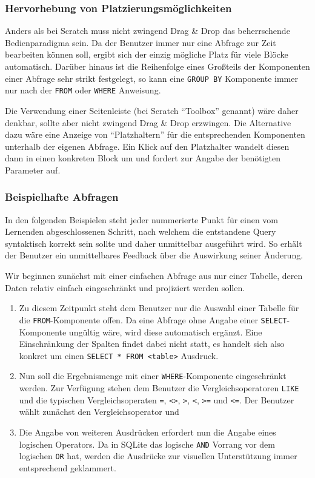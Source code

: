 \documentclass[paper=a4,fontsize=11pt,parskip=half]{scrartcl}
\begin{document}
\subsubsection{Hervorhebung von Platzierungsmöglichkeiten}

Anders als bei Scratch muss nicht zwingend Drag \& Drop das beherrschende Bedienparadigma sein. Da der Benutzer immer nur eine Abfrage zur Zeit bearbeiten können soll, ergibt sich der einzig mögliche Platz für viele Blöcke automatisch. Darüber hinaus ist die Reihenfolge eines Großteils der Komponenten einer Abfrage sehr strikt festgelegt, so kann eine \texttt{GROUP BY} Komponente immer nur nach der \texttt{FROM} oder \texttt{WHERE} Anweisung.

Die Verwendung einer Seitenleiste (bei Scratch ``Toolbox'' genannt) wäre daher denkbar, sollte aber nicht zwingend Drag \& Drop erzwingen. Die Alternative dazu wäre eine Anzeige von ``Platzhaltern'' für die entsprechenden Komponenten unterhalb der eigenen Abfrage. Ein Klick auf den Platzhalter wandelt diesen dann in einen konkreten Block um und fordert zur Angabe der benötigten Parameter auf.


\subsubsection{Beispielhafte Abfragen}

In den folgenden Beispielen steht jeder nummerierte Punkt für einen vom Lernenden abgeschlossenen Schritt, nach welchem die entstandene Query syntaktisch korrekt sein sollte und daher unmittelbar ausgeführt wird. So erhält der Benutzer ein unmittelbares Feedback über die Auswirkung seiner Änderung.

Wir beginnen zunächst mit einer einfachen Abfrage aus nur einer Tabelle, deren Daten relativ einfach eingeschränkt und projiziert werden sollen.

\begin{enumerate}
  \item Zu diesem Zeitpunkt steht dem Benutzer nur die Auswahl einer Tabelle für die \texttt{FROM}-Komponente offen. Da eine Abfrage ohne Angabe einer \texttt{SELECT}-Komponente ungültig wäre, wird diese automatisch ergänzt. Eine Einschränkung der Spalten findet dabei nicht statt, es handelt sich also konkret um einen \texttt{SELECT * FROM <table>} Ausdruck.
  \item Nun soll die Ergebnismenge mit einer \texttt{WHERE}-Komponente eingeschränkt werden. Zur Verfügung stehen dem Benutzer die Vergleichsoperatoren \texttt{LIKE} und die typischen Vergleichsoperaten \texttt{=}, \texttt{<>}, \texttt{>}, \texttt{<}, \texttt{>=} und \texttt{<=}. Der Benutzer wählt zunächst den Vergleichsoperator und
  \item Die Angabe von weiteren Ausdrücken erfordert nun die Angabe eines logischen Operators. Da in SQLite das logische \texttt{AND} Vorrang vor dem logischen \texttt{OR} hat, werden die Ausdrücke zur visuellen Unterstützung immer entsprechend geklammert.
\end{enumerate}
\end{document}
